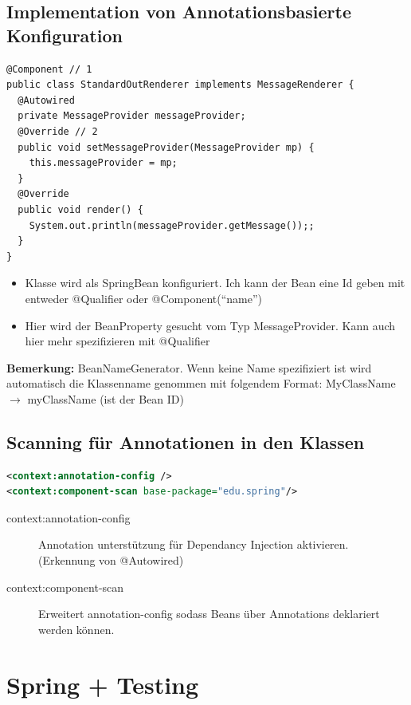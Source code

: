\documentclass[a4paper,10pt]{scrreprt}
\begin{document}
\subsection{Implementation von Annotationsbasierte Konfiguration}
\begin{lstlisting}[caption=Annotationsbasierte Konfiguration]
@Component // 1
public class StandardOutRenderer implements MessageRenderer {
  @Autowired
  private MessageProvider messageProvider;
  @Override // 2
  public void setMessageProvider(MessageProvider mp) {
    this.messageProvider = mp;
  }
  @Override
  public void render() {
    System.out.println(messageProvider.getMessage());;
  }
}
\end{lstlisting}

\begin{itemize}
 \item Klasse wird als SpringBean konfiguriert. Ich kann der Bean eine Id geben mit entweder @Qualifier oder @Component(``name'')
 \item Hier wird der BeanProperty gesucht vom Typ MessageProvider. Kann auch hier mehr spezifizieren mit @Qualifier
\end{itemize}
\textbf{Bemerkung:} BeanNameGenerator. Wenn keine Name spezifiziert ist wird automatisch die Klassenname genommen mit folgendem Format:
MyClassName $\rightarrow$ myClassName (ist der Bean ID)

\subsection{Scanning für Annotationen in den Klassen}
\begin{lstlisting}[language=xml,caption=Annotation Scanning aktivieren"]
 <context:annotation-config />
<context:component-scan base-package="edu.spring"/>
\end{lstlisting}
\begin{description}
 \item [context:annotation-config] Annotation unterstützung für Dependancy Injection aktivieren. (Erkennung von @Autowired)
 \item [context:component-scan] Erweitert annotation-config sodass Beans über Annotations deklariert werden können.
\end{description}

\section{Spring + Testing}
\end{document}

